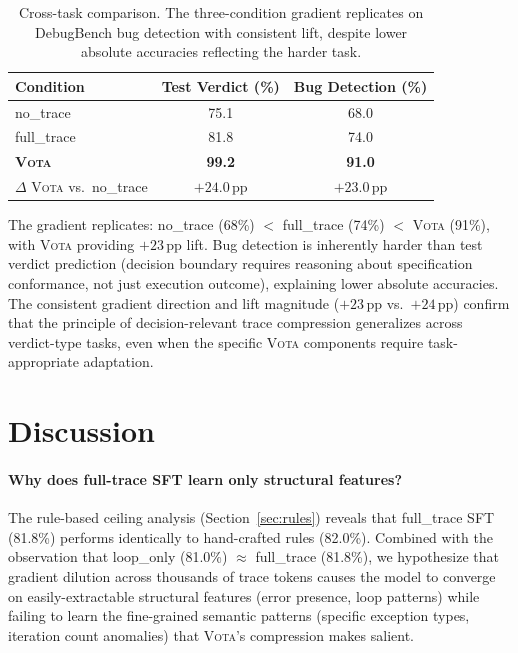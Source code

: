 \documentclass[11pt,a4paper]{article}
\newcommand{\vota}{\textsc{Vota}}
\newcommand{\pp}{\,\text{pp}}
\begin{document}
\begin{table}[t]
\centering
\small
\begin{tabular}{lcc}
\toprule
\textbf{Condition} & \textbf{Test Verdict (\%)} & \textbf{Bug Detection (\%)} \\
\midrule
no\_trace & 75.1 & 68.0 \\
full\_trace & 81.8 & 74.0 \\
\textbf{\vota{}} & \textbf{99.2} & \textbf{91.0} \\
\midrule
$\Delta$ \vota{} vs.\ no\_trace & $+24.0\pp$ & $+23.0\pp$ \\
\bottomrule
\end{tabular}
\caption{Cross-task comparison. The three-condition gradient replicates on DebugBench bug detection with consistent lift, despite lower absolute accuracies reflecting the harder task.}
\label{tab:debugbench}
\end{table}

The gradient replicates: no\_trace (68\%) $<$ full\_trace (74\%) $<$ \vota{} (91\%), with \vota{} providing $+23\pp$ lift.
Bug detection is inherently harder than test verdict prediction (decision boundary requires reasoning about specification conformance, not just execution outcome), explaining lower absolute accuracies.
The consistent gradient direction and lift magnitude ($+23\pp$ vs.\ $+24\pp$) confirm that the principle of decision-relevant trace compression generalizes across verdict-type tasks, even when the specific \vota{} components require task-appropriate adaptation.

\section{Discussion}
\label{sec:discussion}

\paragraph{Why does full-trace SFT learn only structural features?}
The rule-based ceiling analysis (Section~\ref{sec:rules}) reveals that full\_trace SFT (81.8\%) performs identically to hand-crafted rules (82.0\%).
Combined with the observation that loop\_only (81.0\%) $\approx$ full\_trace (81.8\%), we hypothesize that gradient dilution across thousands of trace tokens causes the model to converge on easily-extractable structural features (error presence, loop patterns) while failing to learn the fine-grained semantic patterns (specific exception types, iteration count anomalies) that \vota{}'s compression makes salient.
\end{document}
